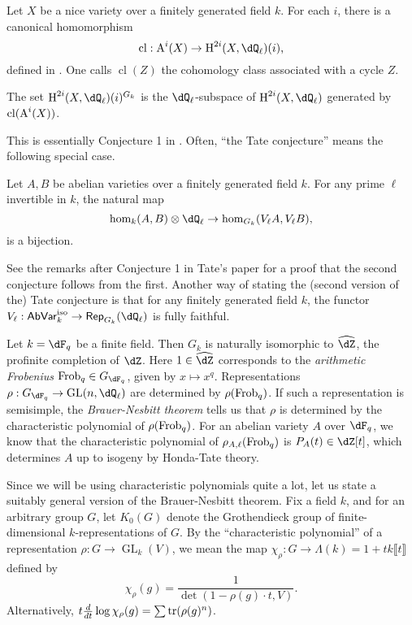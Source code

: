 Let $X$ be a nice variety over a finitely generated field $k$. For each $i$, 
there is a canonical homomorphism 
\[
  \operatorname{cl}:\chow^i(X) \to \h^{2 i}(X,\dQ_\ell)(i)\text{,}
\]
defined in \cite[VI 2.2.10]{de77}. One calls $\operatorname{cl}(Z)$ the 
cohomology class associated with a cycle $Z$. 

\begin{conjecture}[Tate]
The set $\h^{2 i}(X,\dQ_\ell)(i)^{G_k}$ is the $\dQ_\ell$-subspace of $\h^{2 i}(X,\dQ_\ell)$ 
generated by $\operatorname{cl}(\operatorname{A}^i(X))$. 
\end{conjecture}

This is essentially Conjecture 1 in \cite{ta65}. Often, ``the Tate conjecture'' 
means the following special case. 

\begin{conjecture}[Tate]
Let $A,B$ be abelian varieties over a finitely generated field $k$. For any 
prime $\ell$ invertible in $k$, the natural map 
\[
  \hom_k(A,B)\otimes\dQ_\ell \to \hom_{G_k}(V_\ell A, V_\ell B) \text{,}
\]
is a bijection. 
\end{conjecture}

See the remarks after Conjecture 1 in Tate's paper for a proof that the second 
conjecture follows from the first. Another way of stating the (second version 
of the) Tate conjecture is that for any finitely generated field $k$, the 
functor $V_\ell:\mathsf{AbVar}_k^\text{iso} \to \mathsf{Rep}_{G_k}(\dQ_\ell)$ 
is fully faithful. 

\begin{example}
Let $k=\dF_q$ be a finite field. Then $G_k$ is naturally isomorphic to 
$\widehat\dZ$, the profinite completion of $\dZ$. Here $1\in \widehat\dZ$ 
corresponds to the \emph{arithmetic Frobenius} $\frob_q\in G_{\dF_q}$, given by 
$x\mapsto x^q$. Representations 
$\rho:G_{\dF_q} \to \gl{n}{\dQ_\ell}$ are determined by 
$\rho(\mathrm{Frob}_q)$. If such a representation is semisimple, the 
\emph{Brauer-Nesbitt theorem} tells us that $\rho$ is determined by the 
characteristic polynomial of $\rho(\mathrm{Frob}_q)$. For an abelian variety $A$ over 
$\dF_q$, we know that the characteristic polynomial of 
$\rho_{A,\ell}(\mathrm{Frob}_q)$ is $P_A(t)\in \dZ[t]$, which determines $A$ up to 
isogeny by Honda-Tate theory. 
\end{example}

Since we will be using characteristic polynomials quite a lot, let us state a 
suitably general version of the Brauer-Nesbitt theorem. Fix a field $k$, and 
for an arbitrary group $G$, let $K_0(G)$ denote the Grothendieck group of 
finite-dimensional $k$-representations of $G$. By the ``characteristic 
polynomial'' of a representation $\rho:G \to \operatorname{GL}_k(V)$, we mean 
the map $\chi_\rho:G\to \Lambda(k)=1+t k\llbracket t\rrbracket$ defined by 
\[
  \chi_\rho(g) = \frac{1}{\det(1-\rho(g)\cdot t, V)} \text{.}
\]
Alternatively, $t\frac{d}{dt} \log \chi_\rho(g) = \sum \operatorname{tr}(\rho(g)^n)$. 

